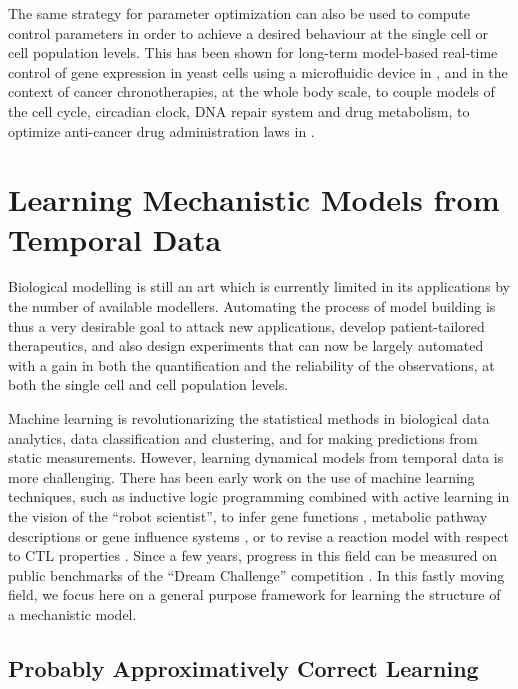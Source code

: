 \documentclass[graybox]{svmult}
\begin{document}
The same strategy for parameter optimization can also be used
to compute control parameters in order to achieve a desired behaviour
at the single cell or cell population levels.
This has been shown for long-term model-based real-time control of
gene expression in yeast cells using a microfluidic device in \cite{UMDCFBBH12},
and in the context of cancer chronotherapies, at the whole body scale, to couple models of the cell cycle, circadian clock, 
DNA repair system and drug metabolism,
to optimize anti-cancer drug administration laws in \cite{BDACOCL11plos,DFRS11tcs}.



\section{Learning Mechanistic Models from Temporal Data}\label{learning}

Biological modelling is still an art which is currently limited in its applications by the number of available modellers.
Automating the process of model building is thus a very desirable goal
to attack new applications, develop patient-tailored therapeutics,
and also design experiments that can now be largely automated
with a gain in both the quantification and the reliability of the observations, at both the single cell and cell population levels.

Machine learning is revolutionarizing the statistical methods in biological data analytics,
data classification and clustering, and for making predictions from static measurements.
However, learning dynamical models from temporal data is more challenging.
There has been early work on the use of machine learning techniques, such as inductive
 logic programming \cite{Muggleton95ngc} combined with active learning in the vision of the ``robot scientist'',
to infer gene functions \cite{BMOKRK01etai},
metabolic pathway descriptions \cite{AM02etai,AM02slps}
or gene influence systems \cite{BCRG04jtb},
or to revise a reaction model with respect to CTL properties \cite{CCFS06tcsb}.
Since a few years, progress in this field can be measured on public benchmarks
of the ``Dream Challenge'' competition \cite{Meyer14bmc}.
In this fastly moving field, we focus here on a general purpose framework for learning the structure of a mechanistic model.

\subsection{Probably Approximatively Correct Learning}\label{pac}
\end{document}
